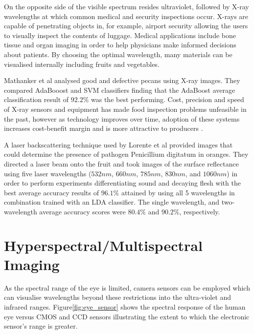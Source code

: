 \documentclass[fleqn,twoside,12pt]{report}
\begin{document}
On the opposite side of the visible spectrum resides ultraviolet, followed by X-ray wavelengths at which common medical and security inspections occur. X-rays are capable of penetrating objects in, for example, airport security allowing the users to visually inspect the contents of luggage. Medical applications include bone tissue and organ imaging in order to help physicians make informed decisions about patients. By choosing the optimal wavelength, many materials can be visualised internally including fruits and vegetables.    

Mathanker et al \cite{mathanker} analysed good and defective pecans using X-ray images. They compared AdaBooost and SVM classifiers finding that the AdaBoost average classification result of $92.2\%$ was the best performing. Cost, precision and speed of X-ray sensors and equipment has made food inspection problems unfeasible in the past, however as technology improves over time, adoption of these systems increases cost-benefit margin and is more attractive to producers \cite{haff}.

A laser backscattering technique used by Lorente et al \cite{lorente} provided images that could determine the presence of pathogen Penicillium digitatum in oranges. They directed a laser beam onto the fruit and took images of the surface reflectance using five laser wavelengths ($532nm$, $660nm$, $785nm$, $830nm$, and $1060nm$) in order to perform experiments differentiating sound and decaying flesh with the best average accuracy results of $96.1\%$ attained by using all 5 wavelengths in combination trained with an LDA classifier. The single wavelength, and two-wavelength average accuracy scores were $80.4\%$ and $90.2\%$, respectively.



\section{Hyperspectral/Multispectral Imaging}
\label{sec:lit_hyperspec}

As the spectral range of the eye is limited, camera sensors can be employed which can visualise wavelengths beyond these restrictions into the ultra-violet and infrared ranges. Figure\ref{fig:eye_sensor} shows the spectral response of the human eye versus CMOS and CCD sensors illustrating the extent to which the electronic sensor's range is greater.
\end{document}
